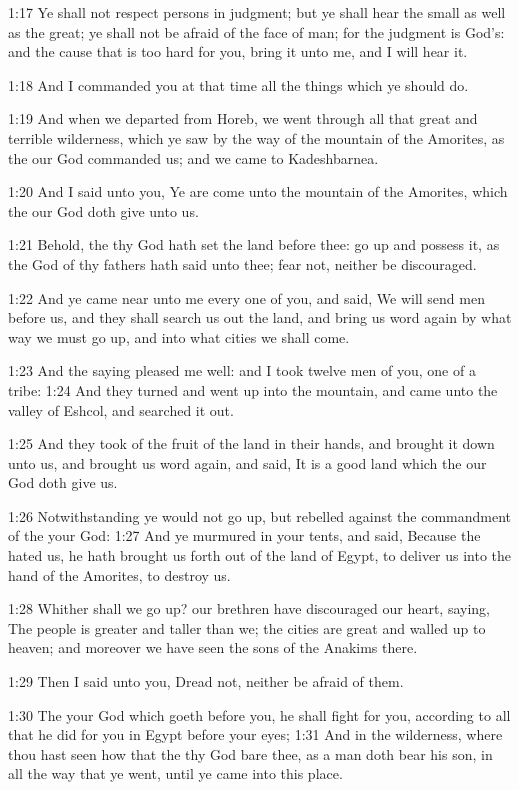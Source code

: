 1:17 Ye shall not respect persons in judgment; but ye shall hear the small as well as the great; ye shall not be afraid of the face of man; for the judgment is God's: and the cause that is too hard for you, bring it unto me, and I will hear it.

1:18 And I commanded you at that time all the things which ye should do.

1:19 And when we departed from Horeb, we went through all that great and terrible wilderness, which ye saw by the way of the mountain of the Amorites, as the \LORD our God commanded us; and we came to Kadeshbarnea.

1:20 And I said unto you, Ye are come unto the mountain of the Amorites, which the \LORD our God doth give unto us.

1:21 Behold, the \LORD thy God hath set the land before thee: go up and possess it, as the \LORD God of thy fathers hath said unto thee; fear not, neither be discouraged.

1:22 And ye came near unto me every one of you, and said, We will send men before us, and they shall search us out the land, and bring us word again by what way we must go up, and into what cities we shall come.

1:23 And the saying pleased me well: and I took twelve men of you, one of a tribe: 1:24 And they turned and went up into the mountain, and came unto the valley of Eshcol, and searched it out.

1:25 And they took of the fruit of the land in their hands, and brought it down unto us, and brought us word again, and said, It is a good land which the \LORD our God doth give us.

1:26 Notwithstanding ye would not go up, but rebelled against the commandment of the \LORD your God: 1:27 And ye murmured in your tents, and said, Because the \LORD hated us, he hath brought us forth out of the land of Egypt, to deliver us into the hand of the Amorites, to destroy us.

1:28 Whither shall we go up? our brethren have discouraged our heart, saying, The people is greater and taller than we; the cities are great and walled up to heaven; and moreover we have seen the sons of the Anakims there.

1:29 Then I said unto you, Dread not, neither be afraid of them.

1:30 The \LORD your God which goeth before you, he shall fight for you, according to all that he did for you in Egypt before your eyes; 1:31 And in the wilderness, where thou hast seen how that the \LORD thy God bare thee, as a man doth bear his son, in all the way that ye went, until ye came into this place.

